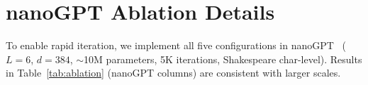 \documentclass{article}
\begin{document}
\section{nanoGPT Ablation Details}
\label{app:nanogpt}

To enable rapid iteration, we implement all five configurations in nanoGPT~\citep{radford2019gpt2} ($L{=}6$, $d{=}384$, ${\sim}$10M parameters, 5K iterations, Shakespeare char-level). Results in Table~\ref{tab:ablation} (nanoGPT columns) are consistent with larger scales.
\end{document}
